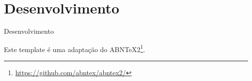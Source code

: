 \chapter*[Desenvolvimento]{Desenvolvimento}

Desenvolvimento

Este template é uma adaptação do ABNTeX2\footnote{\url{https://github.com/abntex/abntex2/}}.